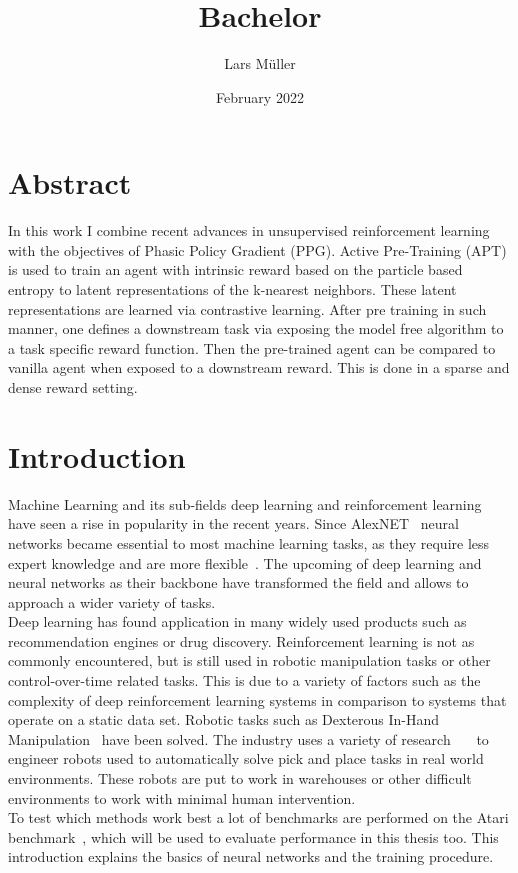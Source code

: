 \documentclass{article}
\title{Bachelor}
\author{Lars Müller}
\date{February 2022}
\begin{document}
\maketitle

\section{Abstract}
In this work I combine recent advances in unsupervised reinforcement learning with the objectives of Phasic Policy Gradient (PPG).
Active Pre-Training (APT) is used to train an agent with intrinsic reward based on the particle based entropy to latent representations
of the k-nearest neighbors. These latent representations are learned via contrastive learning.
After pre training in such manner, one defines a downstream task via exposing the model free algorithm to a task specific reward function.
Then the pre-trained agent can be compared to vanilla agent when exposed to a downstream reward.
This is done in a sparse and dense reward setting.


\section{Introduction}

Machine Learning and its sub-fields deep learning and reinforcement learning have seen
a rise in popularity in the recent years.
Since AlexNET~\cite{NIPS2012_c399862d} neural networks became essential to
most machine learning tasks, as they require less expert knowledge and are
more flexible~\cite{DBLP:journals/corr/abs-1910-13796}. The upcoming of deep learning
and neural networks as their backbone have transformed the field and allows to approach
a wider variety of tasks.\\
Deep learning has found application in many widely used products such as recommendation engines or drug discovery. Reinforcement learning
is not as commonly encountered, but is still used in robotic manipulation tasks or other
control-over-time related tasks. This is due to a variety of factors such as the complexity of deep reinforcement learning systems in comparison to systems that operate on a static data set.
Robotic tasks such as Dexterous In-Hand Manipulation~\cite{DBLP:journals/corr/abs-1808-00177}
have been solved. The industry uses a variety of research~\cite{DBLP:journals/corr/abs-1710-04615}~\cite{Li2020Sub-policy}~\cite{DBLP:journals/corr/abs-1803-05268}
to engineer robots used to automatically solve pick and place tasks in real world environments.
These robots are put to work in warehouses or other difficult environments to work with minimal
human intervention.\\
To test which methods work best a lot of benchmarks are performed on the Atari benchmark~\cite{DBLP:journals/corr/abs-1207-4708},
which will be used to evaluate performance in this thesis too.
This introduction explains the basics of neural networks and the training
procedure.
\end{document}
